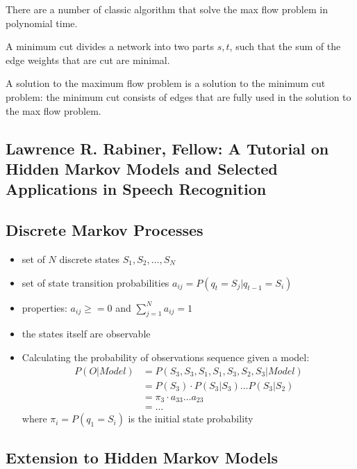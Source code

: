 \documentclass{scrartcl}
\begin{document}
There are a number of classic algorithm that solve the max flow problem in polynomial time.

A minimum cut divides a network into two parts \(s, t\), such that the sum of the edge weights that are cut are minimal.

A solution to the maximum flow problem is a solution to the minimum cut problem: the minimum cut consists of edges that are fully used in the solution to the max flow problem.

\newpage
\begin{appendices}

\section{Lawrence R. Rabiner, Fellow: A Tutorial on Hidden Markov Models and Selected Applications in Speech Recognition}
\subsection{Discrete Markov Processes}
\begin{itemize}
    \item
        set of \(N\) discrete states \(S_1, S_2, \dots, S_N\)
    \item
        set of state transition probabilities \(a_{ij} = P(q_t = S_j | q_{t-1}=S_i)\)
    \item
        properties: \(a_{ij} \geq = 0\) and \(\sum_{j=1}^N a_{ij} = 1\)
    \item
        the states itself are observable
    \item
        Calculating the probability of observations sequence given a model:
        \begin{align*}
            P(O|Model) &= P(S_3, S_3, S_1, S_1, S_3, S_2, S_3|Model)\\
            &= P(S_3) \cdot P(S_3|S_3) \dots P(S_3|S_2)\\
            &= \pi_3 \cdot a_{33} \dots a_{23}\\
            &= \dots
        \end{align*}
        where \(\pi_i = P(q_1 = S_i)\) is the initial state probability
\end{itemize}

\subsection{Extension to Hidden Markov Models}




\end{appendices}
\end{document}
